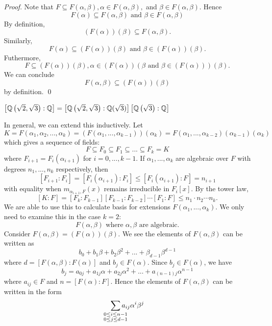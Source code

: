 \begin{proof}
    Note that $F\subseteq F(\alpha, \beta), \alpha \in F(\alpha, \beta),$ and $\beta \in F(\alpha, \beta)$. Hence
    $$F(\alpha) \subseteq F(\alpha, \beta) \text{ and } \beta \in F(\alpha, \beta)$$
    By definition,
    $$\left(F(\alpha)\right)(\beta) \subseteq F(\alpha, \beta).$$
    Similarly,
    $$F(\alpha) \subseteq \left(F(\alpha)\right)(\beta) \text{ and } \beta \in \left(F(\alpha)\right)(\beta).$$
    Futhermore,
    $$F\subseteq \left(F(\alpha)\right)(\beta), \alpha \in \left(F(\alpha)\right)(\beta \text{ and } \beta \in \left(F(\alpha)\right))(\beta).$$
    We can conclude
    $$F(\alpha, \beta) \subseteq \left(F(\alpha)\right)(\beta)$$
    by definition.
    \qed
\end{proof}

\begin{example}
    $\left[\mathbb{Q}\left(\sqrt{2}, \sqrt{3}\right): \mathbb{Q}\right]=\left[\mathbb{Q}\left(\sqrt{2}, \sqrt{3}\right): \mathbb{Q}(\sqrt{3})\right]\left[\mathbb{Q}\left(\sqrt{3}\right): \mathbb{Q}\right]$
\end{example}

In general, we can extend this inductively. Let
$$K = F(\alpha_1, \alpha_2, ..., \alpha_k) = \left(F(\alpha_1, ..., \alpha_{k-1})\right)(\alpha_k) = F(\alpha_1,...,\alpha_{k-2})(\alpha_{k-1})(\alpha_k)$$
which gives a sequence of fields:
$$F \subseteq F_0 \subseteq F_1 \subseteq ... \subseteq F_k = K$$
where $F_{i+1} = F_i(\alpha_{i+1})$ for $i = 0,...,k-1$. If $\alpha_1, ..., \alpha_k$ are algebraic over $F$ with degrees $n_1, ..., n_k$ respectively, then
$$\left[F_{i+1}:F_i\right]=\left[F_i(\alpha_{i+1}):F_i\right] \leq \left[F_i(\alpha_{i+1}):F\right]=n_{i+1}$$
with equality when $m_{\alpha_{i+1}, F}(x)$ remains irreducible in $F_i[x].$ By the tower law,
$$\left[K : F\right] = \left[F_k : F_{k-1}\right]\left[F_{k-1}:F_{k-2}\right]\cdots \left[F_1:F\right] \leq n_1\cdot n_2 \cdots n_k.$$
We are able to use this to calculate basis for extensions $F(\alpha_1, ..., \alpha_k)$. We only need to examine this in the case $k=2$:
$$F(\alpha, \beta) \text{ where $\alpha, \beta$ are algebraic.}$$
Consider $F(\alpha, \beta) = \left(F(\alpha)\right)(\beta).$ We see the elements of $F(\alpha, \beta)$ can be written as
$$b_0 + b_1\beta + b_2 \beta^2 + ... + \beta_{d-1}\beta^{d-1}$$
where $d=\left[F(\alpha, \beta) : F(\alpha)\right]$ and $b_j \in F(\alpha)$. Since $b_j \in F(\alpha)$, we have
$$b_j = a_{0j} + a_{1j}\alpha + a_{2j}\alpha^2 + ... + a_{(n-1)j}\alpha^{n-1}$$
where $a_{ij} \in F$ and $n = \left[F(\alpha) : F\right].$ Hence the elements of $F(\alpha, \beta)$ can be written in the form
$$\sum_{\mathclap{\substack{0 \leq i \leq n-1 \\ 0 \leq j \leq d -1}}}a_{ij}\alpha^i \beta^j$$

